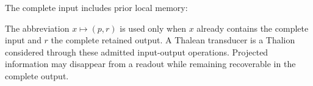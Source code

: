 The complete input includes prior local memory:

The abbreviation $x\mapsto(p,r)$ is used only when $x$ already contains the complete input and $r$ the complete retained output. A Thalean transducer is a Thalion considered through these admitted input-output operations. Projected information may disappear from a readout while remaining recoverable in the complete output.
